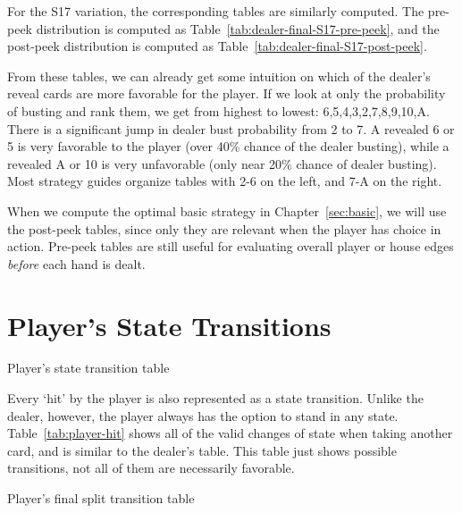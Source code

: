For the S17 variation, the corresponding tables are similarly computed.
The pre-peek distribution is computed as 
Table~\ref{tab:dealer-final-S17-pre-peek}, 
and the post-peek distribution is computed as 
Table~\ref{tab:dealer-final-S17-post-peek}.

From these tables, we can already get some intuition on
which of the dealer's reveal cards are more favorable for the player.
If we look at only the probability of busting and rank them, 
we get from highest to lowest: 6,5,4,3,2,7,8,9,10,A.
There is a significant jump in dealer bust probability from 2 to 7.  
A revealed 6 or 5 is very favorable to the player (over 40\% chance of 
the dealer busting), 
while a revealed A or 10 is very unfavorable 
(only near 20\% chance of dealer busting).
Most strategy guides organize tables with 2-6 on the left, 
and 7-A on the right.

When we compute the optimal basic strategy in Chapter~\ref{sec:basic}, 
we will use the post-peek tables, since only they are relevant
when the player has choice in action.  
Pre-peek tables are still useful for evaluating overall player or house
edges \emph{before} each hand is dealt.

\section{Player's State Transitions}
\label{sec:rules:player-hit}

\begin{table}[ht!]
\caption{Player's state transition table}
\begin{center}

\end{center}
\label{tab:player-hit}
\end{table}

Every `hit' by the player is also represented as a state transition.
Unlike the dealer, however, the player always has the option
to stand in any state.
Table~\ref{tab:player-hit} shows all of the valid changes of state
when taking another card, and is similar to the dealer's table.
This table just shows possible transitions, 
not all of them are necessarily favorable.

\begin{table}[ht!]
\caption{Player's final split transition table}
\begin{center}

\end{center}
\label{tab:player-final-split}
\end{table}


